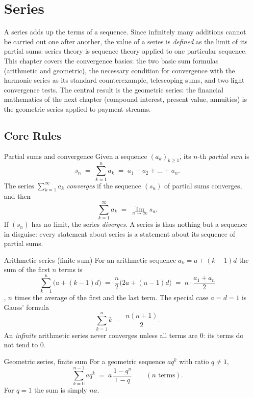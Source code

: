 \chapter{Series}

A series adds up the terms of a sequence. Since infinitely many
additions cannot be carried out one after another, the value of a series is
\emph{defined} as the limit of its partial sums: series theory is sequence
theory applied to one particular sequence. This chapter covers the
convergence basics: the two basic sum formulas (arithmetic and
geometric), the necessary condition for convergence with the harmonic series
as its standard counterexample, telescoping sums, and two light convergence
tests. The central result is the geometric series: the financial
mathematics of the next chapter (compound interest, present value,
annuities) is the geometric series applied to payment streams.

\section{Core Rules}

\begin{rulebox}{Partial sums and convergence}
Given a sequence $(a_k)_{k\ge 1}$, its $n$-th \emph{partial sum} is
\[
  s_n \;=\; \sum_{k=1}^{n} a_k \;=\; a_1+a_2+\dots+a_n .
\]
The series $\sum_{k=1}^{\infty} a_k$ \emph{converges} if the sequence
$(s_n)$ of partial sums converges, and then
\[
  \sum_{k=1}^{\infty} a_k \;=\; \lim_{n\to\infty} s_n .
\]
If $(s_n)$ has no limit, the series \emph{diverges}. A series is thus
nothing but a sequence in disguise: every statement about series is a
statement about its sequence of partial sums.
\end{rulebox}

\begin{rulebox}{Arithmetic series (finite sum)}
For an arithmetic sequence $a_k=a+(k-1)d$ the sum of the first $n$ terms is
\[
  \sum_{k=1}^{n}\bigl(a+(k-1)d\bigr)
  \;=\; \frac{n}{2}\bigl(2a+(n-1)d\bigr)
  \;=\; n\cdot\frac{a_1+a_n}{2}
\],
$n$ times the average of the first and the last term. The special case
$a=d=1$ is Gauss' formula
\[
  \sum_{k=1}^{n} k \;=\; \frac{n(n+1)}{2} .
\]
An \emph{infinite} arithmetic series never
converges unless all terms are $0$: its terms do not tend to $0$.
\end{rulebox}

\begin{rulebox}{Geometric series, finite sum}
For a geometric sequence $a q^{k}$ with ratio $q\neq 1$,
\[
  \sum_{k=0}^{n-1} a q^{k}
  \;=\; a\,\frac{1-q^{n}}{1-q} \qquad (n \text{ terms}).
\]
For $q=1$ the sum is simply $na$.
\end{rulebox}

